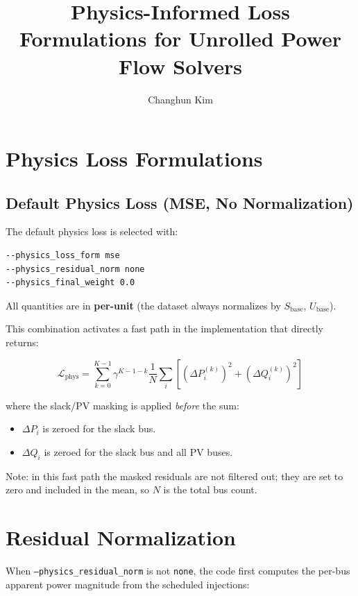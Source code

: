 \documentclass{article}
\title{Physics-Informed Loss Formulations for Unrolled Power Flow Solvers}
\author{%
  Changhun Kim
}
\begin{document}
\maketitle

\section{Physics Loss Formulations}

\subsection{Default Physics Loss (MSE, No Normalization)}

The default physics loss is selected with:

\begin{verbatim}
--physics_loss_form mse
--physics_residual_norm none
--physics_final_weight 0.0
\end{verbatim}

All quantities are in \textbf{per-unit} (the dataset always normalizes by
$S_{\mathrm{base}}$, $U_{\mathrm{base}}$).

This combination activates a fast path in the implementation that directly
returns:

\begin{equation}
  \mathcal{L}_{\mathrm{phys}}
  =
  \sum_{k=0}^{K-1}
  \gamma^{K-1-k}
  \frac{1}{N}
  \sum_i
  \left[
    (\Delta P_i^{(k)})^2
    +
    (\Delta Q_i^{(k)})^2
  \right]
\end{equation}

where the slack/PV masking is applied \emph{before} the sum:
\begin{itemize}[noitemsep]
  \item $\Delta P_i$ is zeroed for the slack bus.
  \item $\Delta Q_i$ is zeroed for the slack bus and all PV buses.
\end{itemize}

Note: in this fast path the masked residuals are not filtered out; they
are set to zero and included in the mean, so $N$ is the total bus count.

\section{Residual Normalization}

When \texttt{--physics\_residual\_norm} is not \texttt{none}, the code
first computes the per-bus apparent power magnitude from the scheduled
injections:
\end{document}
